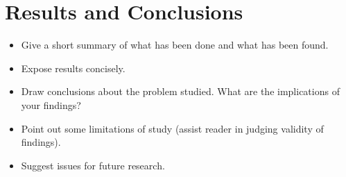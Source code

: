 \section{Results and Conclusions}\label{Sec:Conc}

\begin{itemize}

    \item Give a short summary of what has been done and what has been
    found.

    \item Expose results concisely.

    \item Draw conclusions about the problem studied. What are the
    implications of your findings?

    \item Point out some limitations of study (assist reader in judging validity
    of findings).

    \item Suggest issues for future research.

\end{itemize}
